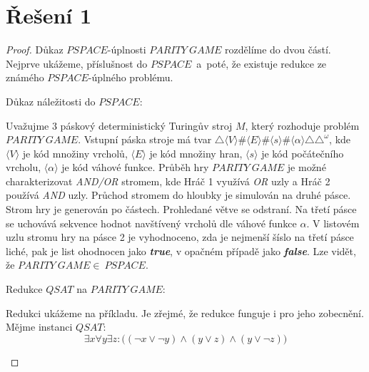 \documentclass[a4paper, 11pt, fleqn]{scrartcl}
\begin{document}
  \section*{Řešení 1}
    \begin{proof}
      Důkaz \footnotesize$\mathit{PSPACE}$\normalsize-úplnosti $\mathit{PARITY~GAME}$ rozdělíme do dvou částí. Nejprve ukážeme, příslušnost do  \footnotesize$\mathit{PSPACE}$\normalsize~a~poté, že existuje redukce ze známého \footnotesize$\mathit{PSPACE}$\normalsize-úplného problému.

      \vspace{0.5cm}

      Důkaz náležitosti do \footnotesize$\mathit{PSPACE}$\normalsize:

        \begin{adjustwidth}{1em}{0em}
          Uvažujme 3 páskový deterministický Turingův stroj $M$, který rozhoduje problém $\mathit{PARITY~GAME}$. Vstupní páska stroje má tvar $\triangle\langle V \rangle\#\langle E \rangle\#\langle s \rangle\#\langle \alpha \rangle \triangle \triangle^\omega$, kde $\langle V \rangle$ je kód množiny vrcholů, $\langle E \rangle$ je kód množiny hran, $\langle s \rangle$ je kód počátečního vrcholu, $\langle \alpha \rangle$ je kód váhové funkce. Průběh hry $\mathit{PARITY~GAME}$ je možné charakterizovat \textit{AND/OR} stromem, kde Hráč 1 využívá \textit{OR} uzly a Hráč 2 používá \textit{AND} uzly. Průchod stromem do hloubky je simulován na druhé pásce. Strom hry je generován po částech. Prohledané větve se odstraní. Na třetí pásce se uchovává sekvence hodnot navštívený vrcholů dle váhové funkce $\alpha$. V listovém uzlu stromu hry na pásce 2 je vyhodnoceno, zda je nejmenší šíslo na třetí pásce liché, pak je list ohodnocen jako \textit{\textbf{true}}, v opačném případě jako \textit{\textbf{false}}. Lze vidět, že $\mathit{PARITY~GAME} \in~$\footnotesize$\mathit{PSPACE}$\normalsize.
        \end{adjustwidth}

      \vspace{0.5cm}

      Redukce $\mathit{QSAT}$ na $\mathit{PARITY~GAME}$:

        \begin{adjustwidth}{1em}{0em}
          Redukci ukážeme na příkladu. Je zřejmé, že redukce funguje i pro jeho zobecnění. Mějme instanci $\mathit{QSAT}$:
          $$\exists x \forall y \exists z : \bigl( (\neg x \lor \neg y) \land (y \lor z) \land (y \lor \neg z)\bigr)$$


\end{adjustwidth}
\end{proof}
\end{document}
